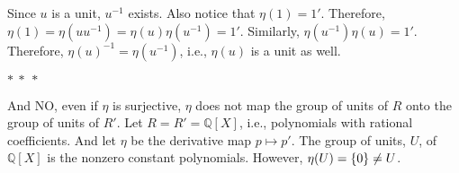 \documentclass[12pt]{article}
\begin{document}
\begin{fproof}[Jacobson 2.7.2]
    Since \(u\) is a unit, \(u^{-1}\) exists.
    Also notice that \(\eta(1) = 1'\).
    Therefore, \(\eta(1) = \eta(uu^{-1}) = \eta(u) \eta(u^{-1}) = 1'\).
    Similarly, \(\eta(u^{-1}) \eta(u) = 1'\).
    Therefore, \(\eta(u)^{-1} = \eta(u^{-1})\), i.e., \(\eta(u)\) is a unit as well.

    \begin{center}
        \(\ast~\ast~\ast\)
    \end{center}

    And NO, even if \(\eta\) is surjective, \(\eta\) does not map the group of units of \(R\) onto the group of units of \(R'\).
    Let \(R = R' = \mathbb{Q}[X]\), i.e., polynomials with rational coefficients.
    And let \(\eta\) be the derivative map \(p \mapsto p'\).
    The group of units, \(U\), of \(\mathbb{Q}[X]\) is the nonzero constant polynomials.
    However, \(\eta(U) = \left\{ 0 \right\} \neq U\).

\end{fproof}
\newpage
\end{document}
